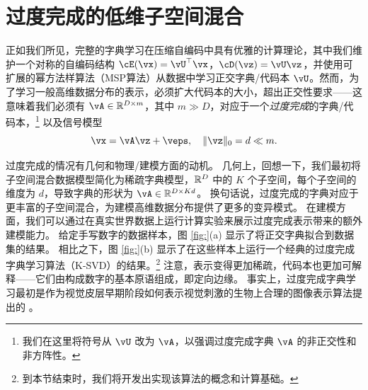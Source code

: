 \documentclass[../../book-main_zh.tex]{subfiles}
\begin{document}
\section{过度完成的低维子空间混合}
\label{sec:dictionary_learning}
正如我们所见，完整的字典学习在压缩自编码中具有优雅的计算理论，其中我们维护一个对称的自编码结构 $\cE(\vx) = \vU^\top \vx$，$\cD(\vz) = \vU \vz$，并使用可扩展的幂方法样算法（MSP算法）从数据中学习正交字典/代码本 $\vU$。然而，为了学习一般高维数据分布的表示，必须扩大代码本的大小，超出正交性要求——这意味着我们必须有 $\vA \in \R^{D \times m}$，其中 $m \gg D$，对应于一个\textit{过度完成}的字典/代码本，\footnote{我们在这里将符号从 $\vU$ 改为 $\vA$，以强调过度完成字典 $\vA$ 的非正交性和非方阵性。} 以及信号模型
\begin{equation}\label{eq:model-DL-overcomplete}
    \vx =  \vA \vz + \veps,
    \quad
    \norm{\vz}_0 = d \ll m.
\end{equation}

过度完成的情况有几何和物理/建模方面的动机。
几何上，回想一下，我们最初将子空间混合数据模型简化为稀疏字典模型，$\mathbb{R}^D$ 中的 $K$ 个子空间，每个子空间的维度为 $d$，导致字典的形状为 $\vA \in \R^{D \times Kd}$。
换句话说，过度完成的字典对应于更丰富的子空间混合，为建模高维数据分布提供了更多的变异模式。
在建模方面，我们可以通过在真实世界数据上运行计算实验来展示过度完成表示带来的额外建模能力。
给定手写数字的数据样本，图 \ref{fig:}(a) 显示了将正交字典拟合到数据集的结果。
相比之下，图 \ref{fig:}(b) 显示了在这些样本上运行一个经典的过度完成字典学习算法（K-SVD）的结果。\footnote{到本节结束时，我们将开发出实现该算法的概念和计算基础。}
注意，表示变得更加稀疏，代码本也更加可解释——它们由构成数字的基本原语组成，即定向边缘。
事实上，过度完成字典学习最初是作为视觉皮层早期阶段如何表示视觉刺激的生物上合理的图像表示算法提出的 \cite{Olshausen1996-ap,Olshausen1997-yv}。
\end{document}
